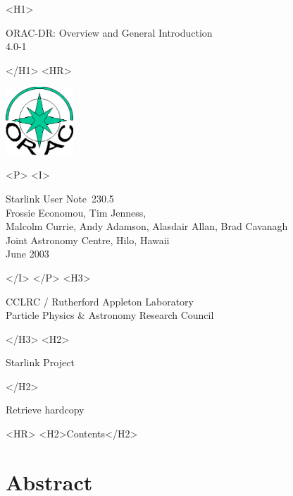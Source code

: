 \documentclass[twoside,11pt]{article}
\newcommand{\stardoccategory}  {Starlink User Note}
\newcommand{\stardocsource}    {sun\stardocnumber}
\newcommand{\stardocnumber}    {230.5}
\newcommand{\stardocauthors}   {Frossie Economou, Tim Jenness,\\ 
Malcolm Currie, Andy Adamson, Alasdair Allan, Brad Cavanagh\\
Joint Astronomy Centre, Hilo, Hawaii}
\newcommand{\stardocdate}      {June 2003}
\newcommand{\stardoctitle}     {ORAC-DR: Overview and General Introduction}
\newcommand{\stardocversion}   {4.0-1}
\newcommand{\stardocmanual}    {}
\newcommand{\htmladdnormallink}[2]{#1}
\newcommand{\htmladdimg}[1]{}
\newcommand{\htmlref}[2]{#1}
\newcommand{\htmladdtonavigation}[1]{}
\newcommand{\xlabel}[1]{}
\renewcommand{\_}{\texttt{\symbol{95}}}
\begin{document}
\begin{htmlonly}
   \xlabel{}
   \begin{rawhtml} <H1> \end{rawhtml}
      \stardoctitle\\
      \stardocversion\\
      \stardocmanual
   \begin{rawhtml} </H1> <HR> \end{rawhtml}

\includegraphics[width=1.0in]{sun230_logo.eps}

   \begin{rawhtml} <P> <I> \end{rawhtml}
   \stardoccategory\ \stardocnumber \\
   \stardocauthors \\
   \stardocdate
   \begin{rawhtml} </I> </P> <H3> \end{rawhtml}
      \htmladdnormallink{CCLRC / Rutherford Appleton Laboratory}
                        {http://www.cclrc.ac.uk} \\
      \htmladdnormallink{Particle Physics \& Astronomy Research Council}
                        {http://www.pparc.ac.uk} \\
   \begin{rawhtml} </H3> <H2> \end{rawhtml}
      \htmladdnormallink{Starlink Project}{http://www.starlink.rl.ac.uk/}
   \begin{rawhtml} </H2> \end{rawhtml}
   \htmladdnormallink{\htmladdimg{source.gif} Retrieve hardcopy}
      {http://www.starlink.rl.ac.uk/cgi-bin/hcserver?\stardocsource}\\

  \label{stardoccontents}
  \begin{rawhtml} 
    <HR>
    <H2>Contents</H2>
  \end{rawhtml}
  \htmladdtonavigation{\htmlref{\htmladdimg{contents_motif.gif}}
        {stardoccontents}}

  \section{\xlabel{abstract}Abstract}
\end{htmlonly}
\end{document}
